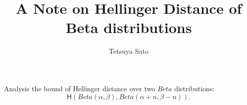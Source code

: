 \documentclass[runningheads,a4paper]{llncs}
\begin{document}
\newcommand{\hlg}{\mathsf{H}}

\title{A Note on Hellinger Distance of Beta distributions}
\author{Tetsuya Sato}
\date{}
\maketitle

Analysis the bound of Hellinger distance over two $Beta$ distributions:
$$
\hlg(Beta(\alpha, \beta), Beta(\alpha + n, \beta - n)).
$$
\end{document}
